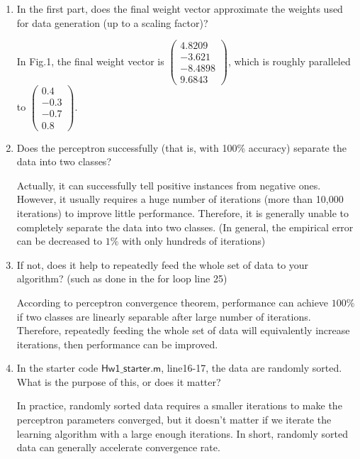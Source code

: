 \documentclass[12pt]{article}
\begin{document}
\begin{enumerate}
	\item In the first part, does the final weight vector approximate the weights used for data generation (up to a scaling factor)?
	\begin{flushleft}
		In Fig.1, the final weight vector is $\begin{pmatrix}4.8209 \\ -3.621\\-8.4898 \\ 9.6843\end{pmatrix}$, which is roughly 
		paralleled to $\begin{pmatrix}0.4 \\ -0.3 \\ -0.7 \\ 0.8\end{pmatrix}$.
	\end{flushleft}
	\item Does the perceptron successfully (that is, with 100\% accuracy) separate the data into two classes?
	\begin{flushleft}
		Actually, it can successfully tell positive instances from negative ones. However, it usually requires a huge number of iterations 
		(more than 10,000 iterations) to improve little performance. Therefore, it is generally unable to completely separate the data into two 
		classes. (In general, the empirical error can be decreased to $1\%$ with only 
		hundreds of iterations)
	\end{flushleft}
	\item If not, does it help to repeatedly feed the whole set of data to your algorithm? (such as done in the for loop line 25)
	\begin{flushleft}
		According to perceptron convergence theorem, performance can achieve $100\%$ if two classes are linearly separable after large number of 
		iterations. Therefore, repeatedly feeding the whole set of data will equivalently increase iterations, then performance can be improved.
	\end{flushleft}
	\item In the starter code $\mathsf{Hw1\_starter.m}$, line16-17, the data are randomly sorted. What is the purpose of this, or does it matter?
	\begin{flushleft}
		In practice, randomly sorted data requires a smaller iterations to make the perceptron parameters converged, but it doesn't matter if we 
		iterate the learning algorithm with a large enough iterations. In short, randomly sorted data can generally accelerate convergence rate.

\end{flushleft}
\end{enumerate}
\end{document}
